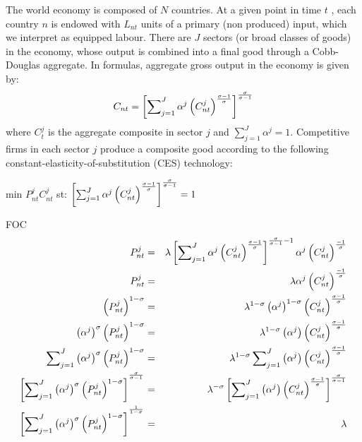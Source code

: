 \documentclass{article}
\begin{document}
The world economy is composed of $N$ countries. At a given point in time $t$%
, each country $n$ is endowed with $L_{nt}$ units of a primary (non
produced) input, which we interpret as equipped labour. There are $J$
sectors (or broad classes of goods) in the economy, whose output is combined
into a final good through a Cobb-Douglas aggregate. In formulas, aggregate
gross output in the economy is given by: 
\begin{equation}
C_{nt}=\left[ \sum\nolimits_{j=1}^{J}\alpha ^{j}\left( C_{nt}^{j}\right) ^{%
\frac{\sigma -1}{\sigma }}\right] ^{\frac{\sigma }{\sigma -1}}
\label{aggregate}
\end{equation}%
where $C_{t}^{j}$ is the aggregate composite in sector $j$ and $%
\sum_{j=1}^{J}\alpha ^{j}=1$. Competitive firms in each sector $j$ produce a
composite good according to the following
constant-elasticity-of-substitution (CES) technology: 

\bigskip min $P_{nt}^{j}C_{nt}^{j}$ st: $\left[ \sum\nolimits_{j=1}^{J}%
\alpha ^{j}\left( C_{nt}^{j}\right) ^{\frac{\sigma -1}{\sigma }}\right] ^{%
\frac{\sigma }{\sigma -1}}=1$

\bigskip FOC%
\begin{eqnarray*}
P_{nt}^{j} &=&\lambda \left[ \sum\nolimits_{j=1}^{J}\alpha ^{j}\left(
C_{nt}^{j}\right) ^{\frac{\sigma -1}{\sigma }}\right] ^{\frac{\sigma }{%
\sigma -1}-1}\alpha ^{j}\left( C_{nt}^{j}\right) ^{\frac{-1}{\sigma }} \\
P_{nt}^{j} &=&\lambda \alpha ^{j}\left( C_{nt}^{j}\right) ^{\frac{-1}{\sigma 
}} \\
\left( P_{nt}^{j}\right) ^{1-\sigma } &=&\lambda ^{1-\sigma }\left( \alpha
^{j}\right) ^{1-\sigma }\left( C_{nt}^{j}\right) ^{\frac{\sigma -1}{\sigma }}
\\
\left( \alpha ^{j}\right) ^{\sigma }\left( P_{nt}^{j}\right) ^{1-\sigma }
&=&\lambda ^{1-\sigma }\left( \alpha ^{j}\right) \left( C_{nt}^{j}\right) ^{%
\frac{\sigma -1}{\sigma }} \\
\sum\nolimits_{j=1}^{J}\left( \alpha ^{j}\right) ^{\sigma }\left(
P_{nt}^{j}\right) ^{1-\sigma } &=&\lambda ^{1-\sigma
}\sum\nolimits_{j=1}^{J}\left( \alpha ^{j}\right) \left( C_{nt}^{j}\right) ^{%
\frac{\sigma -1}{\sigma }} \\
\left[ \sum\nolimits_{j=1}^{J}\left( \alpha ^{j}\right) ^{\sigma }\left(
P_{nt}^{j}\right) ^{1-\sigma }\right] ^{^{\frac{\sigma }{\sigma -1}}}
&=&\lambda ^{-\sigma }\left[ \sum\nolimits_{j=1}^{J}\left( \alpha
^{j}\right) \left( C_{nt}^{j}\right) ^{\frac{\sigma -1}{\sigma }}\right] ^{%
\frac{\sigma }{\sigma -1}} \\
\left[ \sum\nolimits_{j=1}^{J}\left( \alpha ^{j}\right) ^{\sigma }\left(
P_{nt}^{j}\right) ^{1-\sigma }\right] ^{^{\frac{1}{1-\sigma }}} &=&\lambda 
\end{eqnarray*}
\end{document}
